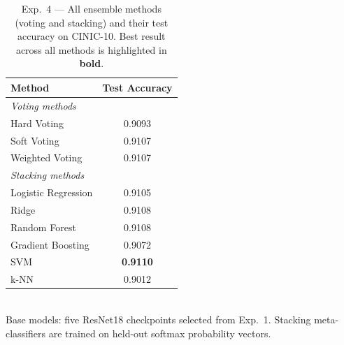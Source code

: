 \begin{table}[H]
\centering
\caption{Exp.\ 4 --- All ensemble methods (voting and stacking) and their test accuracy on CINIC-10. Best result across all methods is highlighted in \textbf{bold}.}
\label{tab:exp4_all}
\small
\begin{tabular}{lc}
\toprule
\textbf{Method} & \textbf{Test Accuracy} \\
\midrule
\multicolumn{2}{l}{\textit{Voting methods}} \\
\midrule
Hard Voting & 0.9093 \\
Soft Voting & 0.9107 \\
Weighted Voting & 0.9107 \\
\midrule
\multicolumn{2}{l}{\textit{Stacking methods}} \\
\midrule
Logistic Regression & 0.9105 \\
Ridge & 0.9108 \\
Random Forest & 0.9108 \\
Gradient Boosting & 0.9072 \\
SVM & \textbf{0.9110} \\
k-NN & 0.9012 \\
\bottomrule
\end{tabular}
\\[4pt]\footnotesize Base models: five ResNet18 checkpoints selected from Exp.\ 1. Stacking meta-classifiers are trained on held-out softmax probability vectors.
\end{table}
